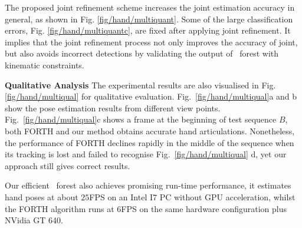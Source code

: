 The proposed joint refinement scheme increases the joint estimation accuracy in general, as shown in Fig. \ref{fig/hand/multiquant}. 
Some of the large classification errors, \eg Fig. \ref{fig/hand/multiquantc}, are fixed after applying joint refinement. It implies that the joint refinement process not only improves the accuracy of joint, but also avoids incorrect detections by validating the output of \STR\ forest with kinematic constraints.

\noindent \textbf{Qualitative Analysis} 
The experimental results are also visualised in Fig. \ref{fig/hand/multiqual} for qualitative evaluation. 
Fig.~\ref{fig/hand/multiqual}a and b show the pose estimation results from different view points.    
Fig.~\ref{fig/hand/multiqual}c shows a frame at the beginning of test sequence $B$, both FORTH and our method obtains accurate hand articulations. Nonetheless, the performance of FORTH declines rapidly in the middle of the sequence when its tracking is lost and failed to recognise Fig.~\ref{fig/hand/multiqual} d, yet our approach still gives correct results. 

Our efficient \STR\ forest also achieves promising run-time performance, it estimates hand poses at about $25$FPS on an Intel I7 PC without GPU acceleration, whilst the FORTH algorithm runs at $6$FPS on the same hardware configuration plus NVidia GT 640. 



